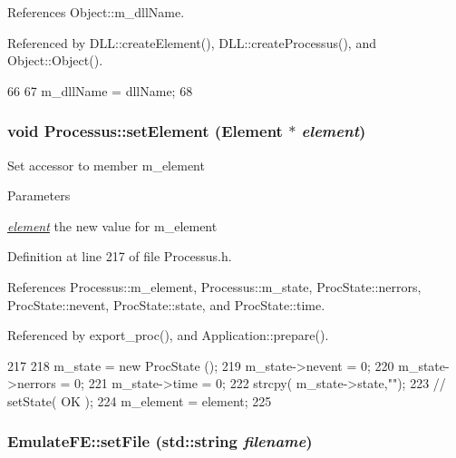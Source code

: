 References Object::m\_\-dllName.

Referenced by DLL::createElement(), DLL::createProcessus(), and Object::Object().


\begin{DoxyCode}
66                                       {
67     m_dllName = dllName;
68   }
\end{DoxyCode}
\hypertarget{classProcessus_a8ddef94227d83d9dae2cd49aebc33353}{
\subsubsection[{setElement}]{\setlength{\rightskip}{0pt plus 5cm}void Processus::setElement ({\bf Element} $\ast$ {\em element})}}
\label{classProcessus_a8ddef94227d83d9dae2cd49aebc33353}
Set accessor to member m\_\-element 
\begin{DoxyParams}{Parameters}
\item[{\em \hyperlink{namespaceelement}{element}}]the new value for m\_\-element \end{DoxyParams}


Definition at line 217 of file Processus.h.

References Processus::m\_\-element, Processus::m\_\-state, ProcState::nerrors, ProcState::nevent, ProcState::state, and ProcState::time.

Referenced by export\_\-proc(), and Application::prepare().


\begin{DoxyCode}
217                                      {
218     m_state = new ProcState ();
219     m_state->nevent  = 0;
220     m_state->nerrors = 0;
221     m_state->time    = 0;
222     strcpy( m_state->state,"");
223     //  setState( OK );
224     m_element = element;
225   }
\end{DoxyCode}
\hypertarget{classEmulateFE_a33403f61dc51ffc30c008cf5782636b1}{
\subsubsection[{setFile}]{ EmulateFE::setFile (std::string {\em filename})}}
\label{classEmulateFE_a33403f61dc51ffc30c008cf5782636b1}


